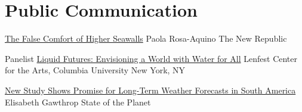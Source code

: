 \section{Public Communication}

{\href{https://newrepublic.com/article/155519/false-comfort-higher-seawalls}
	{The False Comfort of Higher Seawalls}}
{Paola Rosa-Aquino}
{The New Republic}
{}
{}

{Panelist}
{\href{https://lenfest.arts.columbia.edu/events/liquid-futures-envisioning-world-water-all-fall-2019}{Liquid Futures: Envisioning a World with Water for All}}
{Lenfest Center for the Arts, Columbia University}
{New York, NY}
{}

{\href{https://blogs.ei.columbia.edu/2018/08/06/subseasonal-weather-forecasts-paraguay/}
	{New Study Shows Promise for Long-Term Weather Forecasts in South America}}
{Elisabeth Gawthrop}
{State of the Planet}
{}
{}
